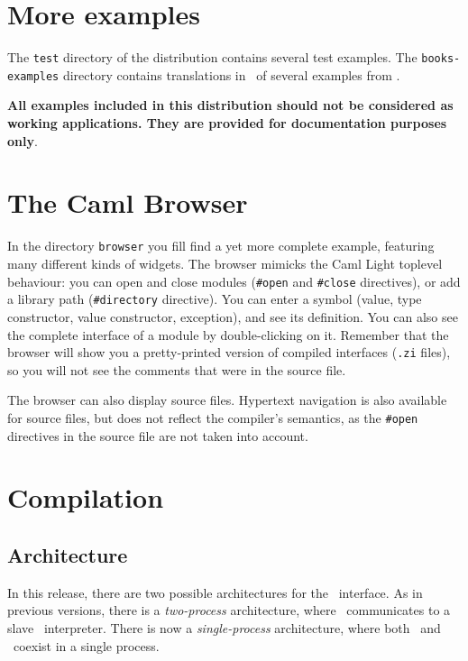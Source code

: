 \section{More examples}
The \verb|test| directory of the distribution contains several test
examples. 
The \verb|books-examples| directory contains translations in \camltk\ of
several examples from \cite{ouster94}.


{\bf All examples included in this distribution  should not be considered as
working applications. They are provided for documentation purposes only}.

\section{The Caml Browser}
In the directory {\tt browser} you fill find a yet more complete example,
featuring many different kinds of widgets. The browser mimicks the Caml
Light toplevel behaviour: you can open and close modules ({\tt \#open} and
{\tt \#close} directives), or add a library path ({\tt \#directory} directive).
You can enter a symbol (value, type constructor, value constructor,
exception), and see its definition. You can also see the complete interface
of a module by double-clicking on it. 
Remember that the browser will show you a pretty-printed version
of compiled interfaces ({\tt .zi} files), so you will not see the comments
that were in the source file.

The browser can also display source files. Hypertext navigation is also
available for source files, but does not reflect the compiler's semantics,
as the \verb|#open| directives in the source file are not taken into
account.


\section{Compilation}
\label{sec:compiling}
\subsection{Architecture}
In this release, there are two possible architectures for the \camltk\
interface. As in previous versions, there is a {\em two-process}
architecture, where \caml\ communicates to a slave \wish\ interpreter.
There is now a {\em single-process} architecture, where both \caml\ and \tk\
coexist in a single process.


